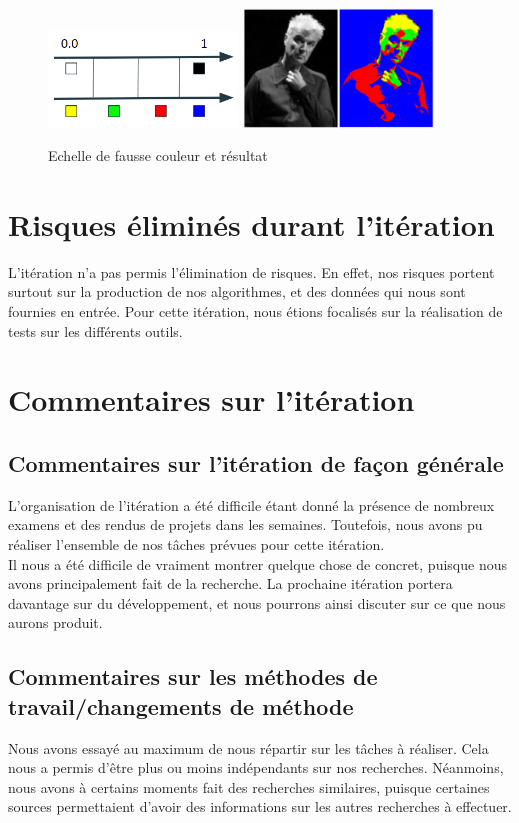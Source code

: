 \documentclass[12pt,titlepage,french]{article}
\begin{document}
\begin{figure}[!hbtp]
  \caption{\label{} Echelle de fausse couleur et résultat}
  \includegraphics[width=0.45\textwidth]{./img/false_color_scale.png}
  \includegraphics[width=0.45\textwidth]{./img/false_color.png}
\end{figure}
\section{Risques éliminés durant l'itération}
L'itération n'a pas permis l'élimination de risques. En effet, nos risques portent surtout sur la production de nos algorithmes, et des données qui nous sont fournies en entrée. Pour cette itération, nous étions focalisés sur la réalisation de tests sur les différents outils.

\section{Commentaires sur l'itération}

\subsection{Commentaires sur l'itération de façon générale}
L'organisation de l'itération a été difficile étant donné la présence de nombreux examens et des rendus de projets dans les semaines. Toutefois, nous avons pu réaliser l'ensemble de nos tâches prévues pour cette itération.\\
Il nous a été difficile de vraiment montrer quelque chose de concret, puisque nous avons principalement fait de la recherche. La prochaine itération portera davantage sur du développement, et nous pourrons ainsi discuter sur ce que nous aurons produit.

\subsection{Commentaires sur les méthodes de travail/changements de méthode}
Nous avons essayé au maximum de nous répartir sur les tâches à réaliser. Cela nous a permis d'être plus ou moins indépendants sur nos recherches. Néanmoins, nous avons à certains moments fait des recherches similaires, puisque certaines sources permettaient d'avoir des informations sur les autres recherches à effectuer.
\end{document}
